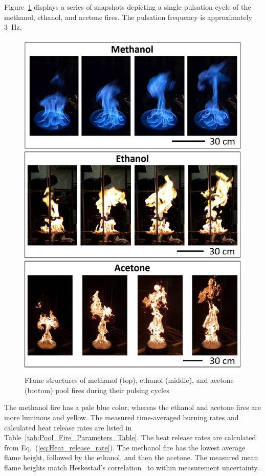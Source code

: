 \documentclass[12pt]{article}
\begin{document}
Figure~\ref{fig:Flame_Structure} displays a series of snapshots depicting a single pulsation cycle of the methanol, ethanol, and acetone fires. The pulsation frequency is approximately 3~Hz.
\begin{figure}[p]
	\centering
\includegraphics[width=5.0in,keepaspectratio]{Flame_Structure.png}
	\caption[Photographs of the three fires]{Flame structures of methanol (top), ethanol (middle), and acetone (bottom) pool fires during their pulsing cycles}
	\label{fig:Flame_Structure}
\end{figure}
The methanol fire has a pale blue color, whereas the ethanol and acetone fires are more luminous and yellow. The measured time-averaged burning rates and calculated heat release rates are listed in Table~\ref{tab:Pool_Fire_Parameters_Table}. The heat release rates are calculated from Eq.~(\ref{eq:Heat_release_rate}). The methanol fire has the lowest average flame height, followed by the ethanol, and then the acetone. The measured mean flame heights match Heskestad’s correlation~\cite{Heskestad1983} to within measurement uncertainty.
\end{document}
